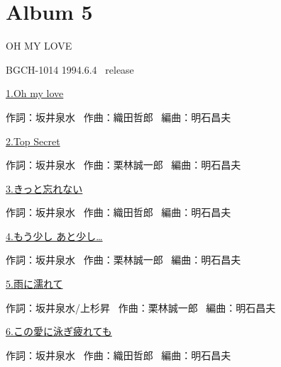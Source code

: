 
\chapter{Album 5}
\thispagestyle{empty} %
\vspace{-16mm}
\LARGE {OH MY LOVE}

\normalsize{BGCH-1014 1994.6.4 \ release}
\\

\vspace{-5mm}


\small{\hyperlink{5_0}{1.Oh my love}}

\tiny{作詞：坂井泉水 \ 作曲：織田哲郎 \ 編曲：明石昌夫}

\small{\hyperlink{5_1}{2.Top Secret}}

\tiny{作詞：坂井泉水 \ 作曲：栗林誠一郎 \ 編曲：明石昌夫}

\small{\hyperlink{5_2}{3.きっと忘れない}}

\tiny{作詞：坂井泉水 \ 作曲：織田哲郎 \ 編曲：明石昌夫}

\small{\hyperlink{5_3}{4.もう少し あと少し…}}

\tiny{作詞：坂井泉水 \ 作曲：栗林誠一郎 \ 編曲：明石昌夫}

\small{\hyperlink{5_4}{5.雨に濡れて}}

\tiny{作詞：坂井泉水/上杉昇 \ 作曲：栗林誠一郎 \ 編曲：明石昌夫}

\small{\hyperlink{5_5}{6.この愛に泳ぎ疲れても}}

\tiny{作詞：坂井泉水 \ 作曲：織田哲郎 \ 編曲：明石昌夫}

